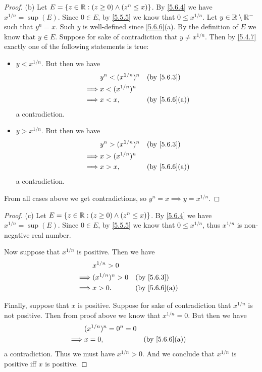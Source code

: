 \begin{proof}{(b)}
  Let \(E = \left\lbrace z \in \mathbb{R} : (z \geq 0) \land (z^n \leq x)\right\rbrace\).
  By \cref{5.6.4} we have \(x^{1 / n} = \sup(E)\).
  Since \(0 \in E\), by \cref{5.5.5} we know that \(0 \leq x^{1 / n}\).
  Let \(y \in \mathbb{R} \setminus \mathbb{R}^-\) such that \(y^n = x\).
  Such \(y\) is well-defined since \cref{5.6.6}(a).
  By the definition of \(E\) we know that \(y \in E\).
  Suppose for sake of contradiction that \(y \neq x^{1 / n}\).
  Then by \cref{5.4.7} exactly one of the following statements is true:
  \begin{itemize}
    \item \(y < x^{1 / n}\).
          But then we have
          \begin{align*}
                     & y^n < (x^{1 / n})^n &  & \by{5.6.3}    \\
            \implies & x < (x^{1 / n})^n                      \\
            \implies & x < x,              &  & \by{5.6.6}[a]
          \end{align*}
          a contradiction.
    \item \(y > x^{1 / n}\).
          But then we have
          \begin{align*}
                     & y^n > (x^{1 / n})^n &  & \by{5.6.3}    \\
            \implies & x > (x^{1 / n})^n                      \\
            \implies & x > x,              &  & \by{5.6.6}[a]
          \end{align*}
          a contradiction.
  \end{itemize}
  From all cases above we get contradictions, so \(y^n = x \implies y = x^{1 / n}\).
\end{proof}

\begin{proof}{(c)}
  Let \(E = \left\lbrace z \in \mathbb{R} : (z \geq 0) \land (z^n \leq x)\right\rbrace\).
  By \cref{5.6.4} we have \(x^{1 / n} = \sup(E)\).
  Since \(0 \in E\), by \cref{5.5.5} we know that \(0 \leq x^{1 / n}\), thus \(x^{1 / n}\) is non-negative real number.

  Now suppose that \(x^{1 / n}\) is positive.
  Then we have
  \begin{align*}
             & x^{1 / n} > 0                        \\
    \implies & (x^{1 / n})^n > 0 &  & \by{5.6.3}    \\
    \implies & x > 0.            &  & \by{5.6.6}[a] \\
  \end{align*}

  Finally, suppose that \(x\) is positive.
  Suppose for sake of contradiction that \(x^{1 / n}\) is not positive.
  Then from proof above we know that \(x^{1 / n} = 0\).
  But then we have
  \begin{align*}
             & (x^{1 / n})^n = 0^n = 0                    \\
    \implies & x = 0,                  &  & \by{5.6.6}[a]
  \end{align*}
  a contradiction.
  Thus we must have \(x^{1 / n} > 0\).
  And we conclude that \(x^{1 / n}\) is positive iff \(x\) is positive.
\end{proof}

